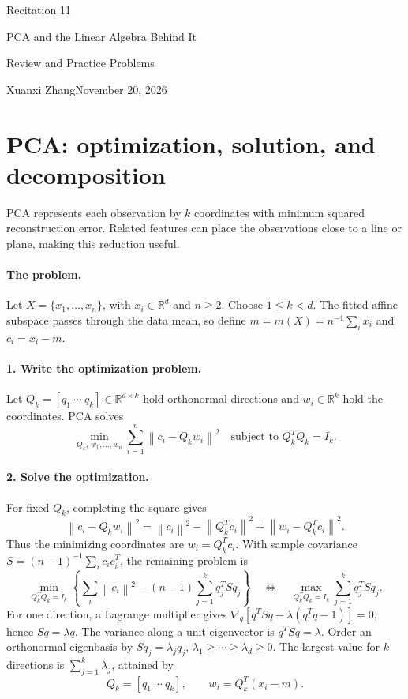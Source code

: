 \documentclass[11pt]{article}
\newif\ifsolutions
\newcommand{\R}{\mathbb R}
\newcommand{\norm}[1]{\left\lVert#1\right\rVert}
\begin{document}
\begin{center}
{\LARGE Recitation 11\par}
\vspace{0.3em}
{\large PCA and the Linear Algebra Behind It\par}
\vspace{0.25em}
{\ifsolutions Solutions and Teaching Notes\else Review and Practice Problems\fi\par}
\vspace{0.4em}
{Xuanxi Zhang\qquad November 20, 2026}
\end{center}
\section{PCA: optimization, solution, and decomposition}
\noindent PCA represents each observation by $k$ coordinates with minimum
squared reconstruction error. Related features can place the observations
close to a line or plane, making this reduction useful.

\paragraph{The problem.}
Let $X=\{x_1,\ldots,x_n\}$, with $x_i\in\R^d$ and $n\geq2$.
Choose $1\leq k<d$. The fitted affine subspace passes through the data mean,
so define $m=m(X)=n^{-1}\sum_i x_i$ and $c_i=x_i-m$.

\paragraph{1. Write the optimization problem.}
Let $Q_k=[q_1\ \cdots\ q_k]\in\R^{d\times k}$ hold orthonormal directions
and $w_i\in\R^k$ hold the coordinates. PCA solves
\[
 \boxed{\min_{Q_k,\,w_1,\ldots,w_n}
 \sum_{i=1}^n\norm{c_i-Q_kw_i}^2
 \quad\text{subject to }Q_k^TQ_k=I_k.}
\]

\paragraph{2. Solve the optimization.}
For fixed $Q_k$, completing the square gives
\[
 \norm{c_i-Q_kw_i}^2
 =\norm{c_i}^2-\norm{Q_k^Tc_i}^2
   +\norm{w_i-Q_k^Tc_i}^2.
\]
Thus the minimizing coordinates are $w_i=Q_k^Tc_i$. With sample covariance
$S=(n-1)^{-1}\sum_i c_ic_i^T$, the remaining problem is
\[
 \min_{Q_k^TQ_k=I_k}
 \left\{\sum_i\norm{c_i}^2-(n-1)\sum_{j=1}^k q_j^TSq_j\right\}
 \quad\Longleftrightarrow\quad
 \max_{Q_k^TQ_k=I_k}\sum_{j=1}^kq_j^TSq_j.
\]
For one direction, a Lagrange multiplier gives
$\nabla_q[q^TSq-\lambda(q^Tq-1)]=0$, hence $Sq=\lambda q$.
The variance along a unit eigenvector is $q^TSq=\lambda$.
Order an orthonormal eigenbasis by
$Sq_j=\lambda_jq_j$, $\lambda_1\geq\cdots\geq\lambda_d\geq0$.
The largest value for $k$ directions is $\sum_{j=1}^k\lambda_j$, attained by
\[
 \boxed{Q_k=[q_1\ \cdots\ q_k],\qquad w_i=Q_k^T(x_i-m).}
\]
\end{document}
